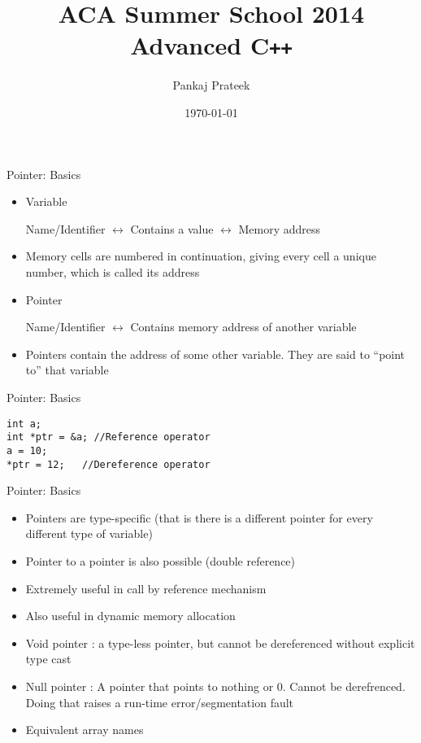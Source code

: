 \documentclass{beamer}
\title{ACA Summer School 2014\\ Advanced C\texttt{++}}
\author{Pankaj Prateek}
\institute{ACA, CSE, IIT Kanpur}
\date{\today}
\begin{document}
\begin{frame}
  \titlepage
\end{frame}

\begin{frame}[fragile]{Pointer: Basics}
  \begin{itemize}
    \item Variable
      \begin{center}
        Name/Identifier $\leftrightarrow$ Contains a value $\leftrightarrow$ Memory address
      \end{center}\pause
    \item Memory cells are numbered in continuation, giving every cell a unique number, which is called its address\pause
    \item Pointer
      \begin{center}
        Name/Identifier $\leftrightarrow$ Contains memory address of another variable
      \end{center}\pause
    \item Pointers contain the address of some other variable. They are said to ``point to'' that variable
  \end{itemize}
\end{frame}

\begin{frame}[fragile]{Pointer: Basics}
  \begin{lstlisting}
int a;
int *ptr = &a; //Reference operator
a = 10;
*ptr = 12;   //Dereference operator
  \end{lstlisting}
\end{frame}

\begin{frame}[fragile]{Pointer: Basics}
  \begin{itemize}
    \item Pointers are type-specific (that is there is a different pointer for every different type of variable)\pause
    \item Pointer to a pointer is also possible (double reference)\pause
    \item Extremely useful in call by reference mechanism\pause
    \item Also useful in dynamic memory allocation\pause
    \item Void pointer : a type-less pointer, but cannot be dereferenced without explicit type cast\pause
    \item Null pointer : A pointer that points to nothing or 0. Cannot be derefrenced. Doing that raises a run-time error/segmentation fault\pause
    \item Equivalent array names
  \end{itemize}
\end{frame}
\end{document}
